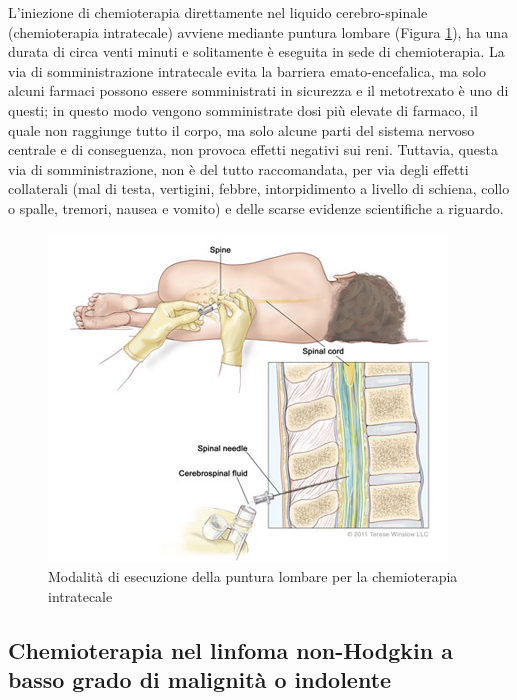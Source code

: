 L’iniezione di chemioterapia direttamente nel liquido cerebro-spinale (chemioterapia intratecale) avviene mediante 
puntura lombare (Figura \ref{fig:FIGURE_4.1}), ha una durata di circa venti minuti e solitamente è eseguita in sede di 
chemioterapia\cite{CNS}. 
La via di somministrazione intratecale evita la barriera emato-encefalica, ma solo alcuni farmaci possono essere 
somministrati in sicurezza e il metotrexato è uno di questi; in questo modo vengono somministrate dosi più elevate di 
farmaco, il quale non raggiunge tutto il corpo, ma solo alcune parti del sistema nervoso centrale e di 
conseguenza, non provoca effetti negativi sui reni. Tuttavia, questa via di somministrazione, non è del tutto 
raccomandata, per via degli effetti collaterali (mal di testa, vertigini, febbre, intorpidimento a livello di schiena, 
collo o spalle, tremori, nausea e vomito) e delle scarse evidenze scientifiche a riguardo\cite{CNS}.

\begin{figure}[H]
    \begin{center}
    \includegraphics[width=0.5\columnwidth]{img/Lumbar-Puncture.jpeg}
    \vspace{-3mm}
    \end{center}
    \caption{Modalità di esecuzione della puntura lombare per la chemioterapia intratecale
    \cite{img39}}
    \label{fig:FIGURE_4.1}
\end{figure}

\subsection{Chemioterapia nel linfoma non-Hodgkin a basso grado di malignità o indolente}

